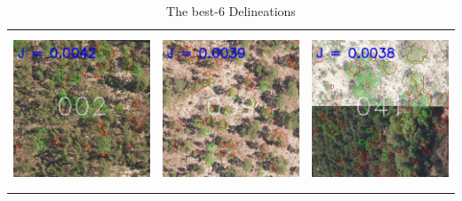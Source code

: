 \documentclass[]{report}   %
\begin{document}
\begin{table}
\label{tab:top3}
\caption{The best-6 Delineations}
\center
\begin{tabular}{lll}
\\
\includegraphics[height=1.8in]{figure/top5_0.jpg} & \includegraphics[height=1.8in]{figure/top5_1.jpg} & \includegraphics[height=1.8in]{figure/top5_2.jpg} \\

\end{tabular}
\end{table}
\end{document}
